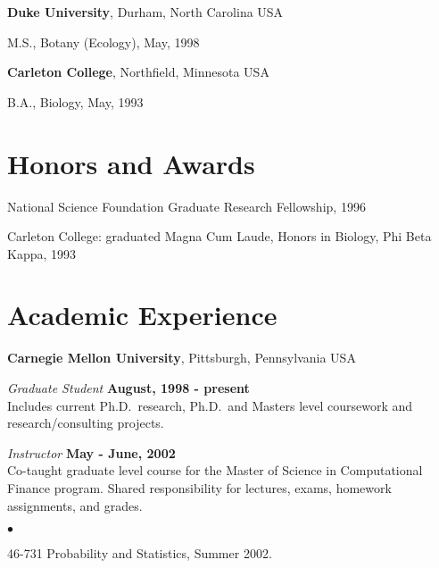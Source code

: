 \documentclass[overlapped,line]{res}
\newenvironment{list1}{
  \begin{list}{\ding{113}}{%
      \setlength{\itemsep}{0in}
      \setlength{\parsep}{0in} \setlength{\parskip}{0in}
      \setlength{\topsep}{0in} \setlength{\partopsep}{0in} 
      \setlength{\leftmargin}{0.17in}}}{\end{list}}
\newenvironment{list2}{
  \begin{list}{$\bullet$}{%
      \setlength{\itemsep}{0in}
      \setlength{\parsep}{0in} \setlength{\parskip}{0in}
      \setlength{\topsep}{0in} \setlength{\partopsep}{0in} 
      \setlength{\leftmargin}{0.2in}}}{\end{list}}
\begin{document}
\begin{resume}
{\bf Duke University}, Durham, North Carolina USA\\
\vspace*{-.1in}
\begin{list1}
\item[] M.S., Botany (Ecology),  May, 1998
\end{list1}

{\bf Carleton College}, Northfield, Minnesota USA\\
\vspace*{-.1in}
\begin{list1}
\item[] B.A., Biology,  May, 1993
\end{list1}


\section{\sc Honors and Awards} 
National Science Foundation Graduate Research Fellowship, 1996

%
\vspace*{-2.5mm}
Carleton College: graduated Magna Cum Laude, Honors in Biology, Phi Beta Kappa, 1993

\section{\sc Academic Experience}
{\bf Carnegie Mellon University}, Pittsburgh, Pennsylvania USA

\vspace{-.3cm}
{\em Graduate Student} \hfill {\bf August, 1998 - present}\\
Includes current Ph.D.~research, Ph.D.~and Masters level coursework and
research/consulting projects.

{\em Instructor} \hfill {\bf May - June, 2002}\\
Co-taught graduate level course for the Master of Science in
Computational Finance program.  Shared responsibility for lectures, exams,
homework assignments, and  grades.  
\vspace*{.05in}  
\begin{list2}
\item 46-731 Probability and Statistics, Summer 2002.
\end{list2}



\end{resume}
\end{document}
